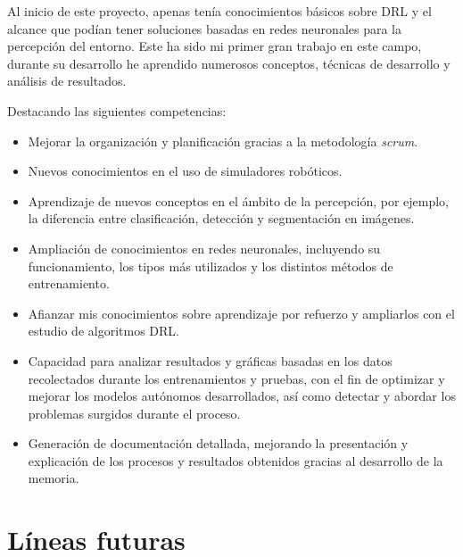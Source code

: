 Al inicio de este proyecto, apenas tenía conocimientos básicos sobre \ac{DRL} y el alcance que podían tener soluciones basadas en redes neuronales para la percepción del entorno. Este ha sido mi primer gran trabajo en este campo, durante su desarrollo he aprendido numerosos conceptos, técnicas de desarrollo y análisis de resultados.

Destacando las siguientes competencias:

\begin{itemize}
\item Mejorar la organización y planificación gracias a la metodología \textit{scrum}.
\item Nuevos conocimientos en el uso de simuladores robóticos.
\item Aprendizaje de nuevos conceptos en el ámbito de la percepción, por ejemplo, la diferencia entre clasificación, detección y segmentación en imágenes.
\item Ampliación de conocimientos en redes neuronales, incluyendo su funcionamiento, los tipos más utilizados y los distintos métodos de entrenamiento.
\item Afianzar mis conocimientos sobre aprendizaje por refuerzo y ampliarlos con el estudio de algoritmos \ac{DRL}.
\item Capacidad para analizar resultados y gráficas basadas en los datos recolectados durante los entrenamientos y pruebas, con el fin de optimizar y mejorar los modelos autónomos desarrollados, así como detectar y abordar los problemas surgidos durante el proceso.
\item Generación de documentación detallada, mejorando la presentación y explicación de los procesos y resultados obtenidos gracias al desarrollo de la memoria.
\end{itemize}

\section{Líneas futuras}

